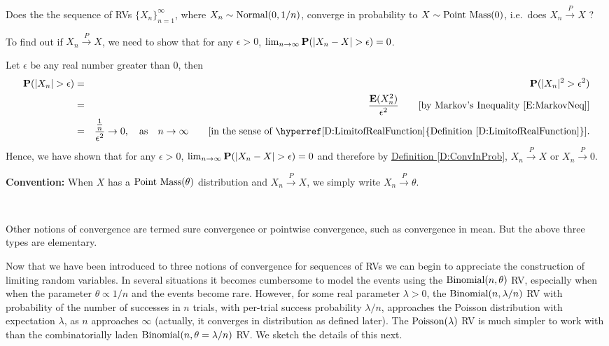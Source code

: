 \begin{example}\label{EX:Normal01bynConvinProbToPointMass0}
Does the the sequence of RVs $\{X_n\}_{n=1}^{\infty}$, where $X_n \sim \mbox{{\rm Normal}}(0,1/n)$, converge in probability to $X \sim \mbox{{\rm Point~Mass}}(0)$, i.e.~does $X_n \overset{P}{\longrightarrow} X$ ?

To find out if $X_n \overset{P}{\longrightarrow} X$, we need to show that for any $\epsilon >0$, $\lim_{n \to \infty} \p(|X_n-X|>\epsilon)=0$.

Let $\epsilon$ be any real number greater than $0$, then
\begin{eqnarray}
\p(|X_n|>\epsilon) &=& \p(|X_n|^2 > \epsilon^2) \notag \\
&=& \frac{\e(X_n^2)}{\epsilon^2} \qquad \text{[by Markov's Inequality \eqref{E:MarkovNeq}]} \notag \\
&=& \frac{\frac{1}{n}}{\epsilon^2} \to 0, \quad \text{as} \quad n \to \infty \qquad \text{[in the sense of \hyperref[D:LimitofRealFunction]{Definition \ref*{D:LimitofRealFunction}}].} \notag
\end{eqnarray}
Hence, we have shown that for any $\epsilon >0$, $\lim_{n \to \infty} \p(|X_n-X|>\epsilon)=0$ and therefore by \hyperref[D:ConvInProb]{Definition \ref*{D:ConvInProb}}, $X_n \overset{P}{\longrightarrow} X$ or $X_n \overset{P}{\longrightarrow} 0$.  

{\scriptsize
{\bf Convention:} When $X$ has a $\mbox{{\rm Point~Mass}}(\theta)$ distribution and $X_n \overset{P}{\longrightarrow} X$, we simply write $X_n \overset{P}{\longrightarrow} \theta$.
}
\end{example}

\begin{definition}
\vspace{5cm}
~
\end{definition}

Other notions of convergence are termed sure convergence or pointwise convergence, such as convergence in mean. But the above three types are elementary.

Now that we have been introduced to three notions of convergence for sequences of RVs we can begin to appreciate the  construction of limiting random variables. %
In several situations it becomes cumbersome to model the events using the $\mbox{{\rm Binomial}}(n,\theta)$ RV, especially when when the parameter $\theta \propto 1/n$ and the events become rare.  However, for some real parameter $\lambda>0$, the $\mbox{{\rm Binomial}}(n,\lambda/n)$ RV with probability of the number of successes in $n$ trials, with per-trial success probability $\lambda/n$, approaches the Poisson distribution with expectation $\lambda$, as $n$ approaches $\infty$ (actually, it converges in distribution as defined later).  The $\mbox{{\rm Poisson}}(\lambda)$ RV is much simpler to work with than the combinatorially laden $\mbox{{\rm Binomial}}(n,\theta=\lambda/n)$ RV.  We sketch the details of this next.

